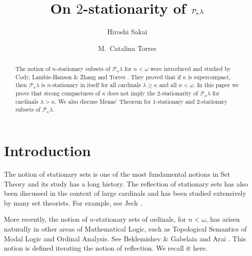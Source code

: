 \documentclass[a4paper,12pt,reqno,oneside]{amsart}
\title[On $2$-stationarity of $\mcal{P}_{\kappa}\lambda$]{On $2$-stationarity of $\mcal{P}_{\kappa}\lambda$}
\author{Hiroshi Sakai}
\author{M.~Catalina Torres}
\theoremstyle{plain}
\newcommand{\mcal}{\mathcal}
\begin{document}

\begin{abstract}
The notion of $n$-stationary subsets of $\mcal{P}_\kappa \lambda$ for $n < \omega$ were introduced and  studied by Cody, Lambie-Hanson \& Zhang \cite{CLHZ} and Torres \cite{T}. They proved that if $\kappa$ is supercompact, then $\mcal{P}_\kappa \lambda$ is $n$-stationary in itself for all cardinals $\lambda \geq \kappa$ and all $n < \omega$. In this paper we prove that strong compactness of $\kappa$ does not imply the $2$-stationarity of $\mcal{P}_\kappa \lambda$ for cardinals $\lambda > \kappa$. We also discuss Menas' Theorem for $1$-stationary and $2$-stationary subsets of $\mcal{P}_\kappa \lambda$.
\end{abstract}


\maketitle

\section{Introduction} \label{intro}
The notion of stationary sets is one of the most fundamental notions in Set Theory and its study has a long history. The reflection of stationary sets has also been discussed in the context of large cardinals and has been studied extensively by many set theorists. For example, see Jech \cite{Je, J}.

More recently, the notion of $n$-stationary sets of ordinals, for $n < \omega$, has arisen  naturally in other areas of Mathematical Logic, such as Topological Semantics of Modal Logic and Ordinal Analysis. See Beklemishev \& Gabelaia \cite{BD} and Arai \cite{Arai}. This notion is defined iterating the notion of reflection. We recall it here.
\end{document}
